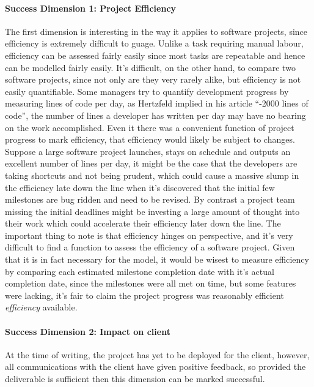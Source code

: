 \paragraph{Success Dimension 1: Project Efficiency}
The first dimension is interesting in the way it applies to software projects, since efficiency is extremely difficult to guage. Unlike a task requiring manual labour, efficiency can be assessed fairly easily since most tasks are repeatable and hence can be modelled fairly easily. It's difficult, on the other hand, to compare two software projects, since not only are they very rarely alike, but efficiency is not easily quantifiable. Some managers try to quantify development progress by measuring lines of code per day, as Hertzfeld implied in his article ``-2000 lines of code'', the number of lines a developer has written per day may have no bearing on the work accomplished. Even it there was a convenient function of project progress to mark efficiency, that efficiency would likely be subject to changes. Suppose a large software project launches, stays on schedule and outputs an excellent number of lines per day, it might be the case that the developers are taking shortcuts and not being prudent, which could cause a massive slump in the efficiency late down the line when it's discovered that the initial few milestones are bug ridden and need to be revised. By contrast a project team missing the initial deadlines might be investing a large amount of thought into their work which could accelerate their efficiency later down the line. The important thing to note is that efficiency hinges on perspective, and it's very difficult to find a function to assess the efficiency of a software project.
Given that it is in fact necessary for the model, it would be wisest to measure efficiency by comparing each estimated milestone completion date with it's actual completion date, since the milestones were all met on time, but some features were lacking, it's fair to claim the project progress was reasonably efficient \emph{efficiency} available. 

\paragraph{Success Dimension 2: Impact on client} At the time of writing, the project has yet to be deployed for the client, however, all communications with the client have given positive feedback, so provided the deliverable is sufficient then this dimension can be marked successful.


